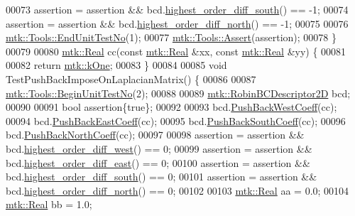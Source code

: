 \begin{DoxyCode}
00073   assertion = assertion && bcd.\hyperlink{classmtk_1_1RobinBCDescriptor2D_a6aaa1f5a3dc46446acd66209f1519410}{highest\_order\_diff\_south}() == -1;
00074   assertion = assertion && bcd.\hyperlink{classmtk_1_1RobinBCDescriptor2D_a77d5d6b65f39bc74072fbc1d638eb899}{highest\_order\_diff\_north}() == -1;
00075 
00076   \hyperlink{classmtk_1_1Tools_aba67d9dc35c9c1c49430fcc9ea035e03}{mtk::Tools::EndUnitTestNo}(1);
00077   \hyperlink{classmtk_1_1Tools_ac6804df469c94ab6a796fb64f1e44a89}{mtk::Tools::Assert}(assertion);
00078 \}
00079 
00080 \hyperlink{group__c01-roots_gac080bbbf5cbb5502c9f00405f894857d}{mtk::Real} cc(\textcolor{keyword}{const} \hyperlink{group__c01-roots_gac080bbbf5cbb5502c9f00405f894857d}{mtk::Real} &xx, \textcolor{keyword}{const} \hyperlink{group__c01-roots_gac080bbbf5cbb5502c9f00405f894857d}{mtk::Real} &yy) \{
00081 
00082   \textcolor{keywordflow}{return} \hyperlink{group__c01-roots_ga26407c24d43b6b95480943340d285c71}{mtk::kOne};
00083 \}
00084 
00085 \textcolor{keywordtype}{void} TestPushBackImposeOnLaplacianMatrix() \{
00086 
00087   \hyperlink{classmtk_1_1Tools_afc29ecaf337a13ed2e817d3890a5a441}{mtk::Tools::BeginUnitTestNo}(2);
00088 
00089   \hyperlink{classmtk_1_1RobinBCDescriptor2D}{mtk::RobinBCDescriptor2D} bcd;
00090 
00091   \textcolor{keywordtype}{bool} assertion\{\textcolor{keyword}{true}\};
00092 
00093   bcd.\hyperlink{classmtk_1_1RobinBCDescriptor2D_a671a38d5ea78be8f0a88ccf034d09987}{PushBackWestCoeff}(cc);
00094   bcd.\hyperlink{classmtk_1_1RobinBCDescriptor2D_a7cc1e6ca729b8b092eb73161eb244160}{PushBackEastCoeff}(cc);
00095   bcd.\hyperlink{classmtk_1_1RobinBCDescriptor2D_ad74c5d9f2c1d0359d350348ac2a7e61e}{PushBackSouthCoeff}(cc);
00096   bcd.\hyperlink{classmtk_1_1RobinBCDescriptor2D_abc6e299516af5d1c5c2d04797875b446}{PushBackNorthCoeff}(cc);
00097 
00098   assertion = assertion && bcd.\hyperlink{classmtk_1_1RobinBCDescriptor2D_ac75fc5f402e3f6e6d4f1e253f8ada98c}{highest\_order\_diff\_west}() == 0;
00099   assertion = assertion && bcd.\hyperlink{classmtk_1_1RobinBCDescriptor2D_aebe62f9ae39b02f9c029257d6e6381af}{highest\_order\_diff\_east}() == 0;
00100   assertion = assertion && bcd.\hyperlink{classmtk_1_1RobinBCDescriptor2D_a6aaa1f5a3dc46446acd66209f1519410}{highest\_order\_diff\_south}() == 0;
00101   assertion = assertion && bcd.\hyperlink{classmtk_1_1RobinBCDescriptor2D_a77d5d6b65f39bc74072fbc1d638eb899}{highest\_order\_diff\_north}() == 0;
00102 
00103   \hyperlink{group__c01-roots_gac080bbbf5cbb5502c9f00405f894857d}{mtk::Real} aa = 0.0;
00104   \hyperlink{group__c01-roots_gac080bbbf5cbb5502c9f00405f894857d}{mtk::Real} bb = 1.0;

\end{DoxyCode}
